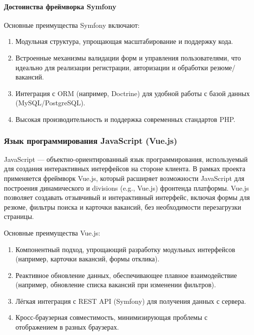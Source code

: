 \paragraph{Достоинства фреймворка Symfony}

Основные преимущества Symfony включают:

\begin{enumerate}
	\item Модульная структура, упрощающая масштабирование и поддержку кода.
	\item Встроенные механизмы валидации форм и управления пользователями, что идеально для реализации регистрации, авторизации и обработки резюме/вакансий.
	\item Интеграция с ORM (например, Doctrine) для удобной работы с базой данных (MySQL/PostgreSQL).
	\item Высокая производительность и поддержка современных стандартов PHP.
\end{enumerate}


\subsubsection{Язык программирования JavaScript (Vue.js)}

JavaScript — объектно-ориентированный язык программирования, используемый для создания интерактивных интерфейсов на стороне клиента. В рамках проекта применяется фреймворк Vue.js, который расширяет возможности JavaScript для построения динамического и divisions (e.g., Vue.js) фронтенда платформы. Vue.js позволяет создавать отзывчивый и интерактивный интерфейс, включая формы для резюме, фильтры поиска и карточки вакансий, без необходимости перезагрузки страницы.

Основные преимущества Vue.js:

\begin{enumerate}
	\item Компонентный подход, упрощающий разработку модульных интерфейсов (например, карточки вакансий, формы отклика).
	\item Реактивное обновление данных, обеспечивающее плавное взаимодействие (например, обновление списка вакансий при изменении фильтров).
	\item Лёгкая интеграция с REST API (Symfony) для получения данных с сервера.
	\item Кросс-браузерная совместимость, минимизирующая проблемы с отображением в разных браузерах.
\end{enumerate}

